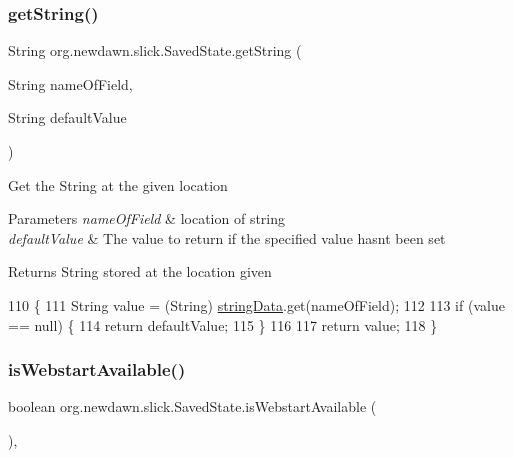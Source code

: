 \subsubsection{\texorpdfstring{get\+String()}{getString()}\hspace{0.1cm}{\footnotesize\ttfamily [2/2]}}
{\footnotesize\ttfamily String org.\+newdawn.\+slick.\+Saved\+State.\+get\+String (\begin{DoxyParamCaption}\item[{String}]{name\+Of\+Field,  }\item[{String}]{default\+Value }\end{DoxyParamCaption})\hspace{0.3cm}{\ttfamily [inline]}}

Get the String at the given location


\begin{DoxyParams}{Parameters}
{\em name\+Of\+Field} & location of string \\
\hline
{\em default\+Value} & The value to return if the specified value hasn\textquotesingle{}t been set \\
\hline
\end{DoxyParams}
\begin{DoxyReturn}{Returns}
String stored at the location given 
\end{DoxyReturn}

\begin{DoxyCode}
110                                                                      \{
111         String value = (String) \mbox{\hyperlink{classorg_1_1newdawn_1_1slick_1_1_saved_state_a5c7e1053721ddfee0b4a2a29facd103b}{stringData}}.get(nameOfField);
112         
113         \textcolor{keywordflow}{if} (value == null) \{
114             \textcolor{keywordflow}{return} defaultValue;
115         \}
116         
117         \textcolor{keywordflow}{return} value;
118     \}
\end{DoxyCode}
\mbox{\label{classorg_1_1newdawn_1_1slick_1_1_saved_state_a2073d608e7e841ae5ff8eef63f596cf2}} 
\subsubsection{\texorpdfstring{is\+Webstart\+Available()}{isWebstartAvailable()}}
{\footnotesize\ttfamily boolean org.\+newdawn.\+slick.\+Saved\+State.\+is\+Webstart\+Available (\begin{DoxyParamCaption}{ }\end{DoxyParamCaption})\hspace{0.3cm}{\ttfamily [inline]}, {\ttfamily [private]}}

